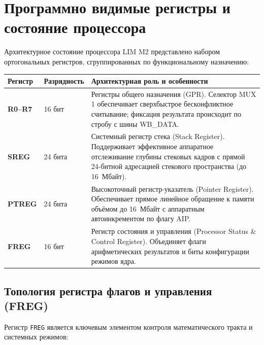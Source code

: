 \documentclass[11pt,a4paper]{article}
\newcommand{\reg}[1]{\texttt{#1}}
\begin{document}
\section{Программно видимые регистры и состояние процессора}
Архитектурное состояние процессора LIM M2 представлено набором ортогональных регистров, сгруппированных по функциональному назначению:

\begin{longtable}{>{\ttfamily\bfseries}p{25mm}p{28mm}p{93mm}}
\toprule
Регистр & Разрядность & Архитектурная роль и особенности \\
\midrule\endhead
R0--R7 & 16 бит & Регистры общего назначения (GPR). Селектор MUX 1 обеспечивает сверхбыстрое бесконфликтное считывание; фиксация результата происходит по стробу с шины WB\_DATA. \\
SREG & 24 бита & Системный регистр стека (Stack Register). Поддерживает эффективное аппаратное отслеживание глубины стековых кадров с прямой 24-битной адресацией стекового пространства (до 16~Мбайт). \\
PTREG & 24 бита & Высокоточный регистр-указатель (Pointer Register). Обеспечивает прямое линейное обращение к памяти объёмом до 16~Мбайт с аппаратным автоинкрементом по флагу AIP. \\
FREG & 16 бит & Регистр состояния и управления (Processor Status \& Control Register). Объединяет флаги арифметических результатов и биты конфигурации режимов ядра. \\
\bottomrule
\end{longtable}

\subsection{Топология регистра флагов и управления (FREG)}
Регистр \reg{FREG} является ключевым элементом контроля математического тракта и системных режимов:
\end{document}
